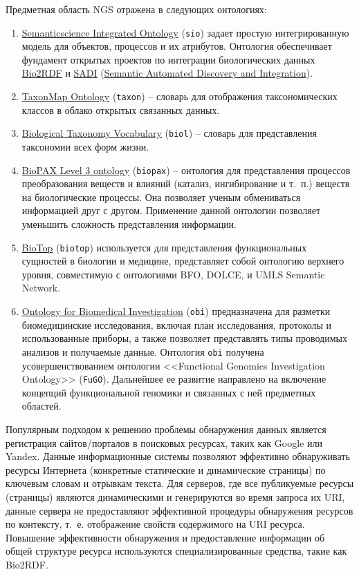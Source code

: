 \documentclass[a4paper,12pt,openany,final]{extreport}
\begin{document}
Предметная область NGS отражена в следующих онтологиях:
\begin{enumerate}
\item \href{https://github.com/micheldumontier/semanticscience}{{Semanticscience Integrated Ontology}} (\texttt{sio}) задает простую интегрированную модель для объектов, процессов и их атрибутов. Онтология обеспечивает фундамент открытых проектов по интеграции биологических данных \href{http://bio2rdf.org}{{Bio2RDF}} и \href{http://sadiframework.org}{{SADI}} (\href{http://sadiframework.org/content/about-sadi/}{{Semantic Automated Discovery and Integration}}).
\item \href{http://purl.org/biodiversity/taxon/}{{TaxonMap Ontology}} (\texttt{taxon}) -- словарь для отображения таксономических классов в облако открытых связанных данных.
\item \href{http://purl.org/NET/biol/ns}{{Biological Taxonomy Vocabulary}} (\texttt{biol}) -- словарь для представления таксономии всех форм жизни.
\item \href{http://www.biopax.org/}{{BioPAX Level 3 ontology}} (\texttt{biopax}) -- онтология для представления процессов преобразования веществ и влияний (катализ, ингибирование и т.~п.) веществ на биологические процессы. Она позволяет ученым обмениваться информацией друг с другом. Применение данной онтологии позволяет уменьшить сложность представления информации.
\item \href{http://biotopontology.github.io/}{{BioTop}} (\texttt{biotop}) используется для представления функциональных сущностей в биологии и медицине, представляет собой онтологию верхнего уровня, совместимую с онтологиями BFO, DOLCE, и UMLS Semantic Network.
\item \href{https://raw.githubusercontent.com/obi-ontology/obi/v2017-09-03/obi.owl}{{Ontology for Biomedical Investigation}} (\texttt{obi}) предназначена для разметки биомедицинские исследования, включая план исследования, протоколы и использованные приборы, а также позволяет представлять типы проводимых анализов и получаемые данные. Онтология \texttt{obi} получена усовершенствованием онтологии <<Functional Genomics Investigation Ontology>> (\texttt{FuGO}). Дальнейшее ее развитие направлено на включение концепций функциональной геномики и связанных с ней предметных областей.
\end{enumerate}

Популярным подходом к решению проблемы обнаружения данных является регистрация сайтов/порталов в поисковых ресурсах, таких как Google или Yandex. Данные информационные системы позволяют эффективно обнаруживать ресурсы Интернета (конкретные статические и динамические страницы) по ключевым словам и отрывкам текста. Для серверов, где все публикуемые ресурсы (страницы) являются динамическими и генерируются во время запроса их URI, данные сервера не предоставляют эффективной процедуры обнаружения ресурсов по контексту, т.~е. отображение свойств содержимого на URI ресурса. Повышение эффективности обнаружения и предоставление информации об общей структуре ресурса используются специализированные средства, такие как Bio2RDF.
\end{document}

